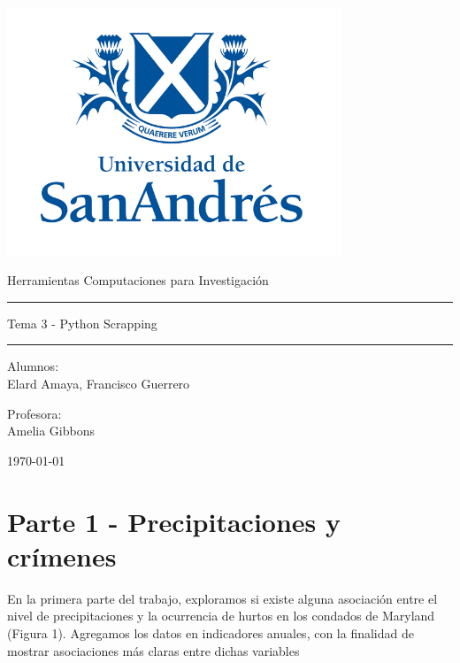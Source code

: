 \documentclass[11pt,a4paper]{article}
\begin{document}
\thispagestyle{empty}
\begin{center}
\includegraphics[width=10cm]{logo udesa.PNG}
\end{center}


	\begin{center}
	\LARGE
	Herramientas Computaciones para Investigación
\\			\vspace{1cm}
\hrule
	\vspace{0.5cm}
	\LARGE
 Tema 3 - Python Scrapping
\\		
		\vspace{0.5cm}
		\hrule
				\vspace{1cm}
	\large

	\vspace{2.5cm}
	\large
		Alumnos:\\
	\large
	Elard Amaya, Francisco Guerrero
	
	
	\vspace{1.3cm}
	\normalsize	
	Profesora:\\

	\normalsize
	Amelia Gibbons
	
	\vspace{1.3cm}
	\today
	\end{center}

\clearpage
\section*{Parte 1 - Precipitaciones y crímenes}

En la primera parte del trabajo, exploramos si existe alguna asociación entre el nivel de precipitaciones y la ocurrencia de hurtos en los condados de Maryland (Figura 1). Agregamos los datos en indicadores anuales, con la finalidad de mostrar asociaciones más claras entre dichas variables 
\end{document}
